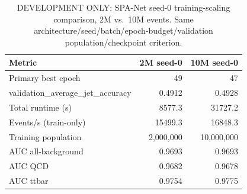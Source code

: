\begin{table}[htbp]
\centering
\caption{DEVELOPMENT ONLY: SPA-Net seed-0 training-scaling comparison, 2M vs.\ 10M events. Same architecture/seed/batch/epoch-budget/validation population/checkpoint criterion.}
\begin{tabular}{lrr}
\hline
Metric & 2M seed-0 & 10M seed-0 \\
\hline
Primary best epoch & 49 & 47 \\
validation\_average\_jet\_accuracy & 0.4912 & 0.4928 \\
Total runtime (s) & 8577.3 & 31727.2 \\
Events/s (train-only) & 15499.3 & 16848.3 \\
Training population & 2,000,000 & 10,000,000 \\
AUC all-background & 0.9693 & 0.9693 \\
AUC QCD & 0.9682 & 0.9678 \\
AUC ttbar & 0.9754 & 0.9775 \\
\hline
\end{tabular}
\end{table}
